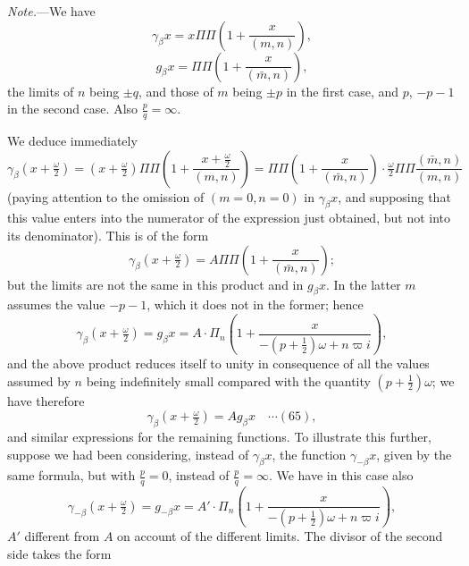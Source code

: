 \documentclass[12pt,a4paper]{article}
\providecommand{\mn}{(m,n)}
\providecommand{\mbn}{(\bar m,n)}
\begin{document}
\textit{Note.}---We have
\[
\gamma_\beta x = x\Pi\Pi\!\left(1 + \frac{x}{\mn}\right),
\]
\[
g_\beta x = \Pi\Pi\!\left(1 + \frac{x}{\mbn}\right),
\]
the limits of $n$ being $\pm q$, and those of $m$ being $\pm p$ in the first case, and $p$, $-p-1$ in the second case. Also $\frac{p}{q} = \infty$.

We deduce immediately
\[
\gamma_\beta\!\left(x + \tfrac{\omega}{2}\right) = \left(x + \tfrac{\omega}{2}\right)\Pi\Pi\!\left(1 + \frac{x + \frac{\omega}{2}}{\mn}\right) = \Pi\Pi\!\left(1 + \frac{x}{\mbn}\right) \cdot \tfrac{\omega}{2}\Pi\Pi\frac{\mbn}{\mn}
\]
(paying attention to the omission of $(m=0,n=0)$ in $\gamma_\beta x$, and supposing that this value enters into the numerator of the expression just obtained, but not into its denominator). This is of the form
\[
\gamma_\beta\!\left(x + \tfrac{\omega}{2}\right) = A\Pi\Pi\!\left(1 + \frac{x}{\mbn}\right);
\]
but the limits are not the same in this product and in $g_\beta x$. In the latter $m$ assumes the value $-p-1$, which it does not in the former; hence
\[
\gamma_\beta\!\left(x + \tfrac{\omega}{2}\right) = g_\beta x = A \cdot \Pi_n\!\left(1 + \frac{x}{-(p+\frac12)\omega + n\varpi i}\right),
\]
and the above product reduces itself to unity in consequence of all the values assumed by $n$ being indefinitely small compared with the quantity $(p+\tfrac12)\omega$; we have therefore
\[
\gamma_\beta\!\left(x + \tfrac{\omega}{2}\right) = A g_\beta x \quad\cdots(65),
\]
and similar expressions for the remaining functions. To illustrate this further, suppose we had been considering, instead of $\gamma_\beta x$, the function $\gamma_{-\beta} x$, given by the same formula, but with $\tfrac{p}{q} = 0$, instead of $\tfrac{p}{q} = \infty$. We have in this case also
\[
\gamma_{-\beta}\!\left(x + \tfrac{\omega}{2}\right) = g_{-\beta} x = A' \cdot \Pi_n\!\left(1 + \frac{x}{-(p+\frac12)\omega + n\varpi i}\right),
\]
$A'$ different from $A$ on account of the different limits. The divisor of the second side takes the form

\newpage
\setcounter{page}{155}
\end{document}

